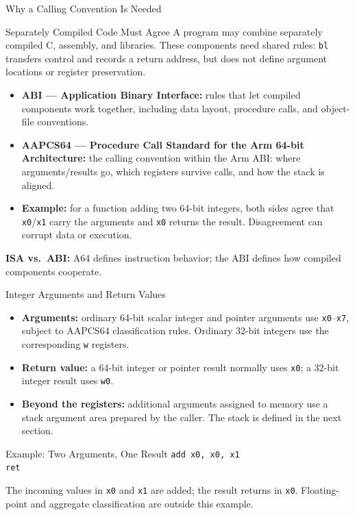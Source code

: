 \documentclass[aspectratio=169,11pt,t]{beamer}
\newcommand{\key}[1]{\textbf{#1}}
\newcommand{\bits}[1]{\texttt{#1}}
\newcommand{\code}[1]{\texttt{#1}}
\begin{document}
\begin{frame}{Why a Calling Convention Is Needed}
\small
{}
\begin{block}{Separately Compiled Code Must Agree}
A program may combine separately compiled C, assembly, and libraries. These components need shared rules: \code{bl} transfers control and records a return address, but does not define argument locations or register preservation.
\end{block}
\begin{itemize}\setlength{\itemsep}{6pt}
\item \key{ABI --- Application Binary Interface:} rules that let compiled components work together, including data layout, procedure calls, and object-file conventions.
\item \key{AAPCS64 --- Procedure Call Standard for the Arm 64-bit Architecture:} the calling convention within the Arm ABI: where arguments/results go, which registers survive calls, and how the stack is aligned.
\item \key{Example:} for a function adding two 64-bit integers, both sides agree that \bits{x0}/\bits{x1} carry the arguments and \bits{x0} returns the result. Disagreement can corrupt data or execution.
\end{itemize}
\vspace{0.15cm}
\small
\key{ISA vs.\ ABI:} A64 defines instruction behavior; the ABI defines how compiled components cooperate.
\end{frame}


\begin{frame}{Integer Arguments and Return Values}
\begin{itemize}\setlength{\itemsep}{8pt}
\item \key{Arguments:} ordinary 64-bit scalar integer and pointer arguments use \bits{x0}--\bits{x7}, subject to AAPCS64 classification rules. Ordinary 32-bit integers use the corresponding \bits{w} registers.
\item \key{Return value:} a 64-bit integer or pointer result normally uses \bits{x0}; a 32-bit integer result uses \bits{w0}.
\item \key{Beyond the registers:} additional arguments assigned to memory use a stack argument area prepared by the caller. The stack is defined in the next section.
\end{itemize}
\vspace{0.18cm}
\begin{block}{Example: Two Arguments, One Result}
\code{add x0, x0, x1}\\[0.10cm]
\code{ret}
\end{block}
\small
The incoming values in \bits{x0} and \bits{x1} are added; the result returns in \bits{x0}. Floating-point and aggregate classification are outside this example.
\end{frame}
\end{document}
